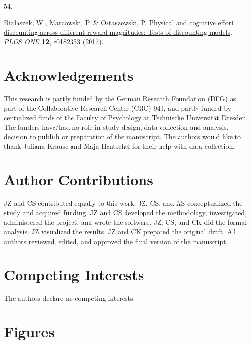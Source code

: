 \documentclass[
  man,floatsintext]{apa6}
\newlength{\cslhangindent}
\newlength{\csllabelwidth}
\newlength{\cslentryspacingunit} %
\newenvironment{CSLReferences}[2] %
 {%
  \setlength{\parindent}{0pt}
  \ifodd #1
  \let\oldpar\par
  \def\par{\hangindent=\cslhangindent\oldpar}
  \fi
  \setlength{\parskip}{#2\cslentryspacingunit}
 }%
 {}
\newcommand{\CSLLeftMargin}[1]{\parbox[t]{\csllabelwidth}{#1}}
\newcommand{\CSLRightInline}[1]{\parbox[t]{\linewidth - \csllabelwidth}{#1}\break}
\begin{document}
\begin{CSLReferences}{0}{0}
\leavevmode{}%
\CSLLeftMargin{54. }%
\CSLRightInline{Białaszek, W., Marcowski, P. \& Ostaszewski, P. \href{https://doi.org/10.1371/journal.pone.0182353}{Physical and cognitive effort discounting across different reward magnitudes: Tests of discounting models}. \emph{{PLOS} {ONE}} \textbf{12}, e0182353 (2017).}

\end{CSLReferences}

\endgroup

\newpage

\hypertarget{acknowledgements}{%
\section{Acknowledgements}\label{acknowledgements}}

This research is partly funded by the German Research Foundation (DFG) as part of the Collaborative Research Center (CRC) 940, and partly funded by centralized funds of the Faculty of Psychology at Technische Universität Dresden.
The funders have/had no role in study design, data collection and analysis, decision to publish or preparation of the manuscript.
The authors would like to thank Juliana Krause and Maja Hentschel for their help with data collection.

\hypertarget{author-contributions}{%
\section{Author Contributions}\label{author-contributions}}

JZ and CS contributed equally to this work.
JZ, CS, and AS conceptualized the study and acquired funding.
JZ and CS developed the methodology, investigated, administered the project, and wrote the software.
JZ, CS, and CK did the formal analysis.
JZ visualized the results.
JZ and CK prepared the original draft.
All authors reviewed, edited, and approved the final version of the manuscript.

\hypertarget{competing-interests}{%
\section{Competing Interests}\label{competing-interests}}

The authors declare no competing interests.

\newpage

\hypertarget{figures}{%
\section{Figures}\label{figures}}
\end{document}
